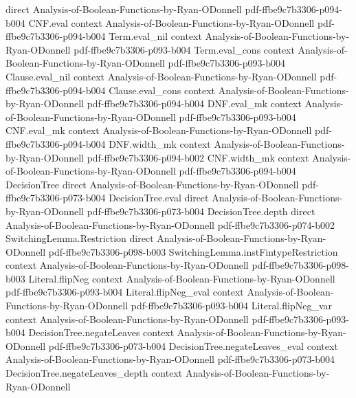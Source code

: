 \begin{lemma}
  {direct}
  {Analysis-of-Boolean-Functions-by-Ryan-ODonnell}
  {pdf-ffbe9c7b3306-p094-b004}
\proofstep
  {CNF.eval}
  {context}
  {Analysis-of-Boolean-Functions-by-Ryan-ODonnell}
  {pdf-ffbe9c7b3306-p094-b004}
\proofstep
  {Term.eval_nil}
  {context}
  {Analysis-of-Boolean-Functions-by-Ryan-ODonnell}
  {pdf-ffbe9c7b3306-p093-b004}
\proofstep
  {Term.eval_cons}
  {context}
  {Analysis-of-Boolean-Functions-by-Ryan-ODonnell}
  {pdf-ffbe9c7b3306-p093-b004}
\proofstep
  {Clause.eval_nil}
  {context}
  {Analysis-of-Boolean-Functions-by-Ryan-ODonnell}
  {pdf-ffbe9c7b3306-p094-b004}
\proofstep
  {Clause.eval_cons}
  {context}
  {Analysis-of-Boolean-Functions-by-Ryan-ODonnell}
  {pdf-ffbe9c7b3306-p094-b004}
\proofstep
  {DNF.eval_mk}
  {context}
  {Analysis-of-Boolean-Functions-by-Ryan-ODonnell}
  {pdf-ffbe9c7b3306-p093-b004}
\proofstep
  {CNF.eval_mk}
  {context}
  {Analysis-of-Boolean-Functions-by-Ryan-ODonnell}
  {pdf-ffbe9c7b3306-p094-b004}
\proofstep
  {DNF.width_mk}
  {context}
  {Analysis-of-Boolean-Functions-by-Ryan-ODonnell}
  {pdf-ffbe9c7b3306-p094-b002}
\proofstep
  {CNF.width_mk}
  {context}
  {Analysis-of-Boolean-Functions-by-Ryan-ODonnell}
  {pdf-ffbe9c7b3306-p094-b004}
\proofstep
  {DecisionTree}
  {direct}
  {Analysis-of-Boolean-Functions-by-Ryan-ODonnell}
  {pdf-ffbe9c7b3306-p073-b004}
\proofstep
  {DecisionTree.eval}
  {direct}
  {Analysis-of-Boolean-Functions-by-Ryan-ODonnell}
  {pdf-ffbe9c7b3306-p073-b004}
\proofstep
  {DecisionTree.depth}
  {direct}
  {Analysis-of-Boolean-Functions-by-Ryan-ODonnell}
  {pdf-ffbe9c7b3306-p074-b002}
\proofstep
  {SwitchingLemma.Restriction}
  {direct}
  {Analysis-of-Boolean-Functions-by-Ryan-ODonnell}
  {pdf-ffbe9c7b3306-p098-b003}
\proofstep
  {SwitchingLemma.instFintypeRestriction}
  {context}
  {Analysis-of-Boolean-Functions-by-Ryan-ODonnell}
  {pdf-ffbe9c7b3306-p098-b003}
\proofstep
  {Literal.flipNeg}
  {context}
  {Analysis-of-Boolean-Functions-by-Ryan-ODonnell}
  {pdf-ffbe9c7b3306-p093-b004}
\proofstep
  {Literal.flipNeg_eval}
  {context}
  {Analysis-of-Boolean-Functions-by-Ryan-ODonnell}
  {pdf-ffbe9c7b3306-p093-b004}
\proofstep
  {Literal.flipNeg_var}
  {context}
  {Analysis-of-Boolean-Functions-by-Ryan-ODonnell}
  {pdf-ffbe9c7b3306-p093-b004}
\proofstep
  {DecisionTree.negateLeaves}
  {context}
  {Analysis-of-Boolean-Functions-by-Ryan-ODonnell}
  {pdf-ffbe9c7b3306-p073-b004}
\proofstep
  {DecisionTree.negateLeaves_eval}
  {context}
  {Analysis-of-Boolean-Functions-by-Ryan-ODonnell}
  {pdf-ffbe9c7b3306-p073-b004}
\proofstep
  {DecisionTree.negateLeaves_depth}
  {context}
  {Analysis-of-Boolean-Functions-by-Ryan-ODonnell}

\end{lemma}
